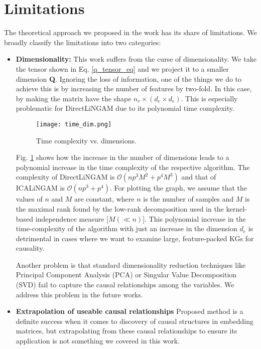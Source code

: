 \documentclass{article}
\begin{document}
\section{Limitations}
\label{limit}
The theoretical approach we proposed in the work has its share of limitations. We broadly classify the limitations into two categories:
\begin{itemize}
    \item \textbf{Dimensionality: }This work suffers from the curse of dimensionality. We take the tensor shown in Eq. \eqref{q_tensor_eq} and we project it to a smaller dimension \textbf{Q}. Ignoring the loss of information, one of the things we do to achieve this is by increasing the number of features by two-fold. In this case, by making the matrix have the shape $n_r \times (d_e \times d_e)$. This is especially problematic for DirectLiNGAM due to its polynomial time complexity. 
\begin{figure}[h!]
    \centering
    \texttt{[image: time\_dim.png]}
    \caption{Time complexity  vs. dimensions.}
    \label{fig:time_dim_graph}
\end{figure}


Fig. \ref{fig:time_dim_graph} shows how the increase in the number of dimensions leads to a polynomial increase in the time complexity of the respective algorithm. The complexity of DirectLiNGAM is $\mathcal{O}(np^3M^2 + p^4M^3)$ and that of ICALiNGAM is $\mathcal{O}(np^3 + p^4)$. For plotting the graph, we assume that the values of $n$ and $M$ are constant, where $n$ is the number of samples and $M$ is the maximal rank found by the low-rank decomposition used in the kernel-based independence measure [$M (\ll n)$]. This polynomial increase in the time-complexity of the algorithm with just an increase in the dimension $d_e$ is detrimental in cases where we want to examine large, feature-packed KGs for causality. 


Another problem is that standard dimensionality reduction techniques like Principal Component Analysis (PCA) or Singular Value Decomposition (SVD) fail to capture the causal relationships among the variables. 
We address this problem in the future works.
    
    \item \textbf{Extrapolation of useable causal relationships} Proposed method is a definite success when it comes to discovery of causal structures in embedding matrices, but extrapolating from these causal relationships to ensure its application is not something we covered in this work.


\end{itemize}
\end{document}
